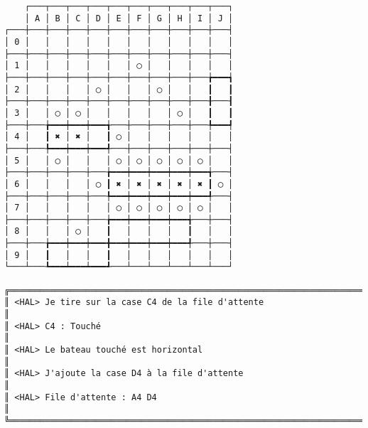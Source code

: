 {\scriptsize
\begin{verbatim}
    ┌───┬───┬───┬───┬───┬───┬───┬───┬───┬───┐
    │ A │ B │ C │ D │ E │ F │ G │ H │ I │ J │
┌───┼───┼───┼───┼───┼───┼───┼───┼───┼───┼───┤
│ 0 │   │   │   │   │   │   │   │   │   │   │
├───┼───┼───┼───┼───┼───┼───┼───┼───┼───┼───┤
│ 1 │   │   │   │   │   │ ◯ │   │   │   │   │
├───┼───┼───┼───┼───┼───┼───┼───┼───┼───╆━━━┪
│ 2 │   │   │   │ ◯ │   │   │ ◯ │   │   ┃   ┃
├───┼───┼───┼───┼───┼───┼───┼───┼───┼───╂───┨
│ 3 │   │ ◯ │ ◯ │   │   │   │   │ ◯ │   ┃   ┃
├───┼───╆━━━┿━━━┿━━━╅───┼───┼───┼───┼───╄━━━┩
│ 4 │   ┃ ✖ │ ✖ │   ┃ ◯ │   │   │   │   │   │
├───┼───╄━━━┿━━━┿━━━╃───┼───┼───┼───┼───┼───┤
│ 5 │   │ ◯ │   │   │ ◯ │ ◯ │ ◯ │ ◯ │ ◯ │   │
├───┼───┼───┼───┼───╆━━━┿━━━┿━━━┿━━━┿━━━╅───┤
│ 6 │   │   │   │ ◯ ┃ ✖ │ ✖ │ ✖ │ ✖ │ ✖ ┃ ◯ │
├───┼───┼───┼───┼───╄━━━┿━━━┿━━━┿━━━┿━━━╃───┤
│ 7 │   │   │   │   │ ◯ │ ◯ │ ◯ │ ◯ │ ◯ │   │
├───┼───┼───┼───┼───╆━━━┿━━━┿━━━┿━━━╅───┼───┤
│ 8 │   │   │ ◯ │   ┃   │   │   │   ┃   │   │
├───┼───╆━━━┿━━━┿━━━╋━━━┿━━━┿━━━┿━━━╃───┼───┤
│ 9 │   ┃   │   │   ┃   │   │   │   │   │   │
└───┴───┺━━━┷━━━┷━━━┹───┴───┴───┴───┴───┴───┘

╔══════════════════════════════════════════════════════════════════════════════════════════════════╗
║ <HAL> Je tire sur la case C4 de la file d'attente                                                ║
║ <HAL> C4 : Touché                                                                                ║
║ <HAL> Le bateau touché est horizontal                                                            ║
║ <HAL> J'ajoute la case D4 à la file d'attente                                                    ║
║ <HAL> File d'attente : A4 D4                                                                     ║
╚══════════════════════════════════════════════════════════════════════════════════════════════════╝
\end{verbatim}}
\newpage

